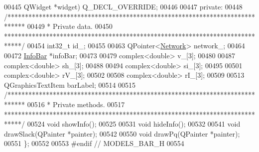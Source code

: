 \begin{DoxyCode}
00445              QWidget *widget) Q\_DECL\_OVERRIDE;
00446 
00447 private:
00448   \textcolor{comment}{/*****************************************************************************}
00449 \textcolor{comment}{  * Private data.}
00450 \textcolor{comment}{  *****************************************************************************/}
00454   int32\_t id\_;
00455 
00463   QPointer<\hyperlink{class_network}{Network}> network\_;
00464 
00472   \hyperlink{class_info_bar}{InfoBar} *infoBar;
00473 
00479   complex<\textcolor{keywordtype}{double}> v\_[3];
00480 
00487   complex<\textcolor{keywordtype}{double}> sh\_[3];
00488 
00494   complex<\textcolor{keywordtype}{double}> si\_[3];
00495 
00501   complex<\textcolor{keywordtype}{double}> rV\_[3];
00502 
00508   complex<\textcolor{keywordtype}{double}> rI\_[3];
00509 
00513   QGraphicsTextItem barLabel;
00514 
00515   \textcolor{comment}{/*****************************************************************************}
00516 \textcolor{comment}{  * Private methods.}
00517 \textcolor{comment}{  *****************************************************************************/}
00524   \textcolor{keywordtype}{void} showInfo();
00525 
00531   \textcolor{keywordtype}{void} hideInfo();
00532 
00541   \textcolor{keywordtype}{void} drawSlack(QPainter *painter);
00542 
00550   \textcolor{keywordtype}{void} drawPq(QPainter *painter);
00551 \};
00552 
00553 \textcolor{preprocessor}{#endif  // MODELS\_BAR\_H}
00554 
\end{DoxyCode}
